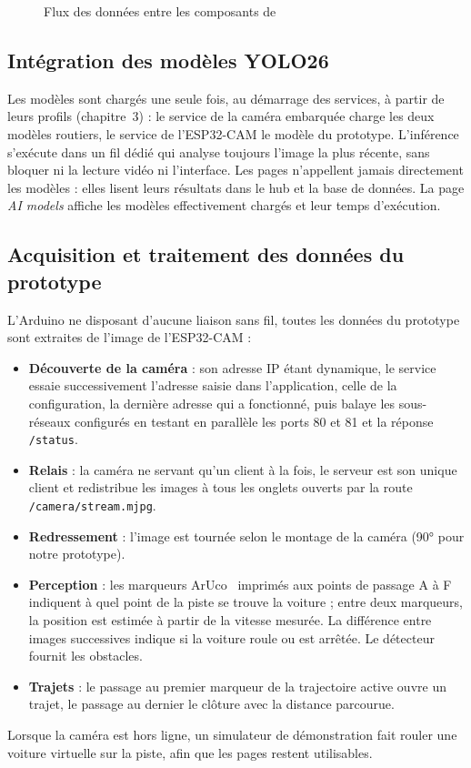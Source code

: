\begin{figure}[H]
\centering
\resizebox{\linewidth}{!}{}
\caption{Flux des données entre les composants de \app}
\label{fig:flux}
\end{figure}

\subsection{Intégration des modèles YOLO26}
Les modèles sont chargés une seule fois, au démarrage des services, à partir de leurs profils
(chapitre~3) : le service de la caméra embarquée charge les deux modèles routiers, le service de l'ESP32-CAM le
modèle du prototype. L'inférence s'exécute dans un fil dédié qui analyse toujours l'image la plus récente, sans
bloquer ni la lecture vidéo ni l'interface. Les pages n'appellent jamais directement les modèles : elles lisent
leurs résultats dans le hub et la base de données. La page \emph{AI models} affiche les modèles effectivement chargés
et leur temps d'exécution.

\subsection{Acquisition et traitement des données du prototype}
L'Arduino ne disposant d'aucune liaison sans fil, toutes les données du prototype sont extraites de l'image de
l'ESP32-CAM :
\begin{itemize}
  \item \textbf{Découverte de la caméra} : son adresse IP étant dynamique, le service essaie successivement l'adresse
        saisie dans l'application, celle de la configuration, la dernière adresse qui a fonctionné, puis balaye les
        sous-réseaux configurés en testant en parallèle les ports 80 et 81 et la réponse \texttt{/status}.
  \item \textbf{Relais} : la caméra ne servant qu'un client à la fois, le serveur est son unique client et
        redistribue les images à tous les onglets ouverts par la route \texttt{/camera/stream.mjpg}.
  \item \textbf{Redressement} : l'image est tournée selon le montage de la caméra (90° pour notre prototype).
  \item \textbf{Perception} : les marqueurs ArUco~\cite{garrido2014aruco} imprimés aux points de passage A à F
        indiquent à quel point de la piste se trouve la voiture ; entre deux marqueurs, la position est estimée à
        partir de la vitesse mesurée. La différence entre images successives indique si la voiture roule ou est
        arrêtée. Le détecteur fournit les obstacles.
  \item \textbf{Trajets} : le passage au premier marqueur de la trajectoire active ouvre un trajet, le passage au
        dernier le clôture avec la distance parcourue.
\end{itemize}
Lorsque la caméra est hors ligne, un simulateur de démonstration fait rouler une voiture virtuelle sur la piste, afin
que les pages restent utilisables.

